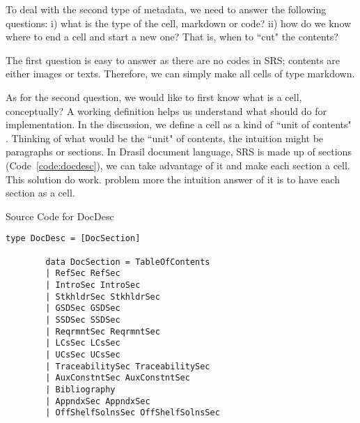 To deal with the second type of metadata, we need to answer the following 
questions: i) what is the type of the cell, markdown or code? ii) how do we 
know where to end a cell and start a new one? That is, when to ``cut" the 
contents?

The first question is easy to answer as there are no codes in SRS; contents are 
either images or texts. Therefore, we can simply make all cells of type 
markdown. 

As for the second question, we would like to first know what is a cell, 
conceptually? A working definition helps us understand what should do for 
implementation. In the discussion, we define a cell as a kind of ``unit of 
contents" \cite{cellsseparation}.  Thinking of what would be the ``unit" of 
contents, the intuition might be paragraphs or sections. In Drasil document 
language, SRS is made up of sections (Code~\ref{code:docdesc}), we can take 
advantage of it and make each section a cell. This solution do work. 
problem more the intuition answer of it is to have each section as a cell.

\begin{listing}
	\caption{Source Code for DocDesc}
	\label{code:docdesc}
	\begin{lstlisting}[language=haskell1]
		type DocDesc = [DocSection]
		
		data DocSection = TableOfContents
		| RefSec RefSec
		| IntroSec IntroSec
		| StkhldrSec StkhldrSec
		| GSDSec GSDSec
		| SSDSec SSDSec
		| ReqrmntSec ReqrmntSec
		| LCsSec LCsSec
		| UCsSec UCsSec
		| TraceabilitySec TraceabilitySec
		| AuxConstntSec AuxConstntSec
		| Bibliography
		| AppndxSec AppndxSec
		| OffShelfSolnsSec OffShelfSolnsSec
	\end{lstlisting}
\end{listing}